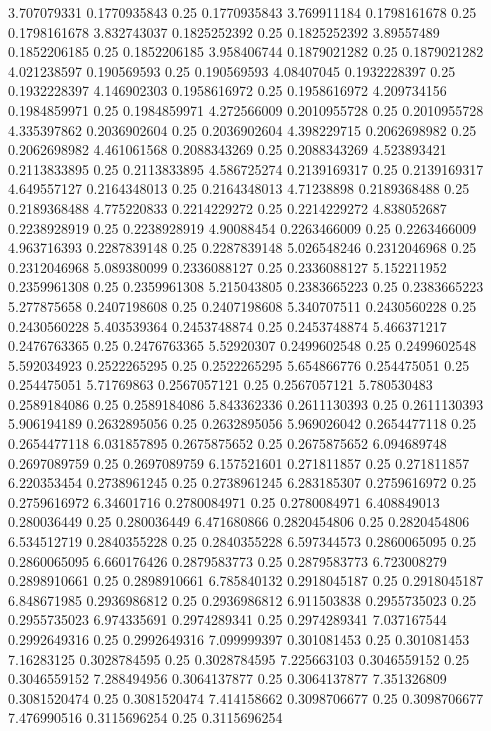 {3.707079331 0.1770935843 0.25 0.1770935843
3.769911184 0.1798161678 0.25 0.1798161678
3.832743037 0.1825252392 0.25 0.1825252392
3.89557489 0.1852206185 0.25 0.1852206185
3.958406744 0.1879021282 0.25 0.1879021282
4.021238597 0.190569593 0.25 0.190569593
4.08407045 0.1932228397 0.25 0.1932228397
4.146902303 0.1958616972 0.25 0.1958616972
4.209734156 0.1984859971 0.25 0.1984859971
4.272566009 0.2010955728 0.25 0.2010955728
4.335397862 0.2036902604 0.25 0.2036902604
4.398229715 0.2062698982 0.25 0.2062698982
4.461061568 0.2088343269 0.25 0.2088343269
4.523893421 0.2113833895 0.25 0.2113833895
4.586725274 0.2139169317 0.25 0.2139169317
4.649557127 0.2164348013 0.25 0.2164348013
4.71238898 0.2189368488 0.25 0.2189368488
4.775220833 0.2214229272 0.25 0.2214229272
4.838052687 0.2238928919 0.25 0.2238928919
4.90088454 0.2263466009 0.25 0.2263466009
4.963716393 0.2287839148 0.25 0.2287839148
5.026548246 0.2312046968 0.25 0.2312046968
5.089380099 0.2336088127 0.25 0.2336088127
5.152211952 0.2359961308 0.25 0.2359961308
5.215043805 0.2383665223 0.25 0.2383665223
5.277875658 0.2407198608 0.25 0.2407198608
5.340707511 0.2430560228 0.25 0.2430560228
5.403539364 0.2453748874 0.25 0.2453748874
5.466371217 0.2476763365 0.25 0.2476763365
5.52920307 0.2499602548 0.25 0.2499602548
5.592034923 0.2522265295 0.25 0.2522265295
5.654866776 0.254475051 0.25 0.254475051
5.71769863 0.2567057121 0.25 0.2567057121
5.780530483 0.2589184086 0.25 0.2589184086
5.843362336 0.2611130393 0.25 0.2611130393
5.906194189 0.2632895056 0.25 0.2632895056
5.969026042 0.2654477118 0.25 0.2654477118
6.031857895 0.2675875652 0.25 0.2675875652
6.094689748 0.2697089759 0.25 0.2697089759
6.157521601 0.271811857 0.25 0.271811857
6.220353454 0.2738961245 0.25 0.2738961245
6.283185307 0.2759616972 0.25 0.2759616972
6.34601716 0.2780084971 0.25 0.2780084971
6.408849013 0.280036449 0.25 0.280036449
6.471680866 0.2820454806 0.25 0.2820454806
6.534512719 0.2840355228 0.25 0.2840355228
6.597344573 0.2860065095 0.25 0.2860065095
6.660176426 0.2879583773 0.25 0.2879583773
6.723008279 0.2898910661 0.25 0.2898910661
6.785840132 0.2918045187 0.25 0.2918045187
6.848671985 0.2936986812 0.25 0.2936986812
6.911503838 0.2955735023 0.25 0.2955735023
6.974335691 0.2974289341 0.25 0.2974289341
7.037167544 0.2992649316 0.25 0.2992649316
7.099999397 0.301081453 0.25 0.301081453
7.16283125 0.3028784595 0.25 0.3028784595
7.225663103 0.3046559152 0.25 0.3046559152
7.288494956 0.3064137877 0.25 0.3064137877
7.351326809 0.3081520474 0.25 0.3081520474
7.414158662 0.3098706677 0.25 0.3098706677
7.476990516 0.3115696254 0.25 0.3115696254
}
